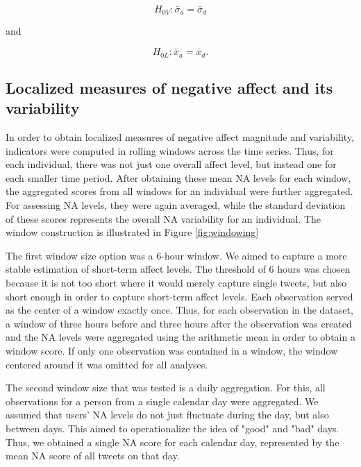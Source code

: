 \begin{equation}
    H_{0V} : \bar{\sigma}_a = \bar{\sigma}_d
\end{equation}

and

\begin{equation}
    H_{0L} : \bar{x}_a = \bar{x}_d.
\end{equation}

\subsection{Localized measures of negative affect and its variability}

In order to obtain localized measures of negative affect magnitude and variability, indicators were computed in rolling windows across the time series. Thus, for each individual, there was not just one overall affect level, but instead one for each smaller time period. After obtaining these mean NA levels for each window, the aggregated scores from all windows for an individual were further aggregated. For assessing NA levels, they were again averaged, while the standard deviation of these scores represents the overall NA variability for an individual. The window construction is illustrated in Figure \ref{fig:windowing}

The first window size option was a 6-hour window. We aimed to capture a more stable estimation of short-term affect levels. The threshold of 6 hours was chosen because it is not too short where it would merely capture single tweets, but also short enough in order to capture short-term affect levels. Each observation served as the center of a window exactly once. Thus, for each observation in the dataset, a window of three hours before and three hours after the observation was created and the NA levels were aggregated using the arithmetic mean in order to obtain a window score. If only one observation was contained in a window, the window centered around it was omitted for all analyses. 

The second window size that was tested is a daily aggregation. For this, all observations for a person from a single calendar day were aggregated. We assumed that users' NA levels do not just fluctuate during the day, but also between days. This aimed to operationalize the idea of "good" and "bad" days. Thus, we obtained a single NA score for each calendar day, represented by the mean NA score of all tweets on that day.



